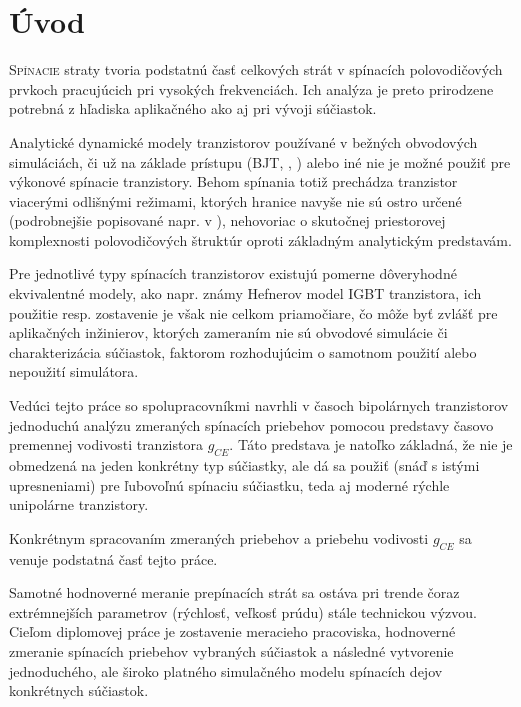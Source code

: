 \chapter*{Úvod} \label{ch:uvod} 


\lettrine{S}{pínacie} straty tvoria podstatnú časť celkových strát v spínacích polovodičových prvkoch pracujúcich pri vysokých frekvenciách. Ich analýza je preto prirodzene potrebná z hľadiska aplikačného ako aj pri vývoji súčiastok.

Analytické dynamické modely tranzistorov používané v bežných obvodových simuláciách, či už na základe  prístupu (BJT, \cite{gummel-poon}, \cite{pierret}) alebo iné nie je možné použiť pre výkonové spínacie tranzistory. Behom spínania totiž prechádza tranzistor viacerými odlišnými režimami, ktorých hranice navyše nie sú ostro určené (podrobnejšie popisované napr. v \cite{baliga}), nehovoriac o skutočnej priestorovej komplexnosti polovodičových štruktúr oproti základným analytickým predstavám.

Pre jednotlivé typy spínacích tranzistorov existujú pomerne dôveryhodné ekvivalentné modely, ako napr. známy Hefnerov model \cite{hefner} IGBT tranzistora, ich použitie resp. zostavenie je však nie celkom priamočiare, čo môže byť zvlášť pre aplikačných inžinierov, ktorých zameraním nie sú obvodové simulácie či charakterizácia súčiastok, faktorom rozhodujúcim o samotnom použití alebo nepoužití simulátora.

Vedúci tejto práce so spolupracovníkmi \cite{valsa-patocka-petru} navrhli v časoch bipolárnych tranzistorov jednoduchú analýzu zmeraných spínacích priebehov pomocou predstavy časovo premennej vodivosti tranzistora $g_{CE}$. Táto predstava je natoľko základná, že nie je obmedzená na jeden konkrétny typ súčiastky, ale dá sa použiť (snáď s istými upresneniami) pre ľubovoľnú spínaciu súčiastku, teda aj moderné rýchle unipolárne tranzistory.

Konkrétnym spracovaním zmeraných priebehov a priebehu vodivosti $g_{CE}$ sa venuje podstatná časť tejto práce.

Samotné hodnoverné meranie prepínacích strát sa ostáva pri trende čoraz extrémnejších parametrov (rýchlosť, veľkosť prúdu) stále technickou výzvou.
Cieľom diplomovej práce je zostavenie meracieho pracoviska, hodnoverné zmeranie spínacích priebehov vybraných súčiastok a následné vytvorenie jednoduchého, ale široko platného simulačného modelu spínacích dejov konkrétnych súčiastok.
